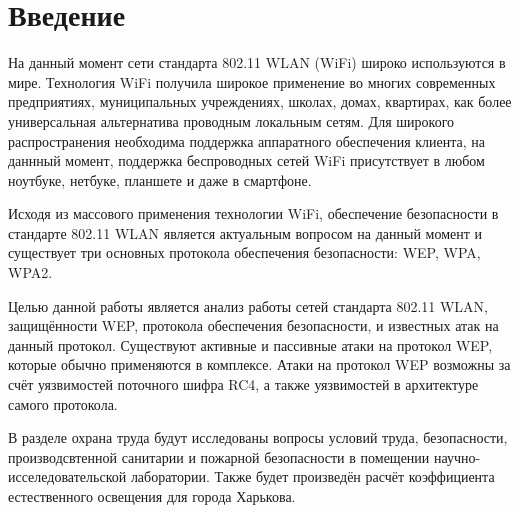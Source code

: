 \chapter*{Введение}

На данный момент сети стандарта 802.11 WLAN (WiFi) широко используются в мире.
Технология WiFi получила широкое применение во многих современных предприятиях,
муниципальных учреждениях, школах, домах, квартирах, как более универсальная
альтернатива проводным локальным сетям. Для широкого распространения необходима
поддержка аппаратного обеспечения клиента, на даннный момент, поддержка
беспроводных сетей WiFi присутствует в любом ноутбуке, нетбуке, планшете и даже
в смартфоне.

Исходя из массового применения технологии WiFi, обеспечение безопасности в
стандарте 802.11 WLAN является актуальным вопросом на данный момент и существует
три основных протокола обеспечения безопасности: WEP, WPA, WPA2.

Целью данной работы является анализ работы сетей стандарта 802.11 WLAN,
защищённости WEP, протокола обеспечения безопасности, и известных атак на данный
протокол. Существуют активные и пассивные атаки на протокол WEP, которые обычно
применяются в комплексе. Атаки на протокол WEP возможны за счёт уязвимостей
поточного шифра RC4, а также уязвимостей в архитектуре самого протокола.

В разделе охрана труда будут исследованы вопросы условий труда, безопасности,
производсвтенной санитарии и пожарной безопасности в помещении
научно-исселедовательской лаборатории. Также будет произведён расчёт
коэффициента естественного освещения для города Харькова.
